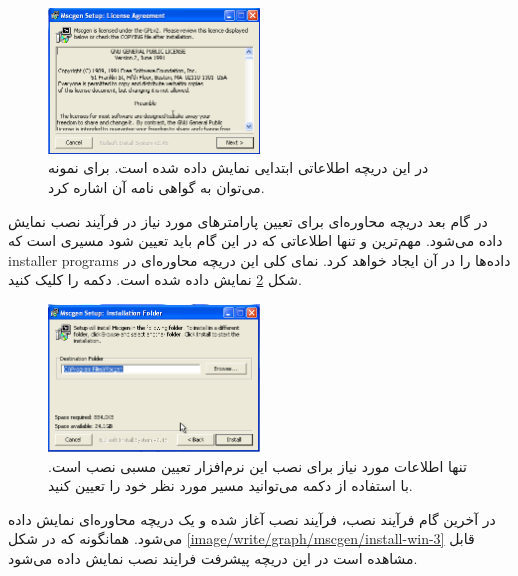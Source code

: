 \begin{figure}
	\centering
	\includegraphics[width=0.5\textwidth]{image/write/graph/mscgen/install-win-1}
	\caption[اطلاعات کلی نرم‌افزار برای نصب در سیستم‌عامل ویندوز]{
		در این دریچه اطلاعاتی ابتدایی نمایش داده شده است. برای نمونه می‌توان به گواهی
		نامه آن اشاره کرد.
	}
	\label{image/write/graph/mscgen/install-win-1}
\end{figure}

در گام بعد دریچه محاوره‌ای برای تعیین پارامترهای مورد نیاز در فرآیند نصب نمایش
داده می‌شود. مهم‌ترین و تنها اطلاعاتی که در این گام باید تعیین شود مسیری است که
\glspl{installer program} داده‌ها را در آن ایجاد خواهد کرد. نمای کلی این دریچه
محاوره‌ای در شکل \ref{image/write/graph/mscgen/install-win-2}
نمایش داده شده است. دکمه  را کلیک کنید.

\begin{figure}
	\centering
	\includegraphics[width=0.5\textwidth]{image/write/graph/mscgen/install-win-2}
	\caption[تنظیم مورد نیاز برای نصب  در ویندوز]{
		تنها اطلاعات مورد نیاز برای نصب این نرم‌افزار تعیین مسبی نصب است. با استفاده
		از دکمه  می‌توانید مسیر مورد نظر خود را تعیین کنید.
	}
	\label{image/write/graph/mscgen/install-win-2}
\end{figure}

در آخرین گام فرآیند نصب، فرآیند نصب آغاز شده و یک دریچه محاوره‌ای نمایش داده
می‌شود. همانگونه که در شکل \ref{image/write/graph/mscgen/install-win-3}
قابل مشاهده است در این دریچه پیشرفت فرایند نصب نمایش داده می‌شود.

